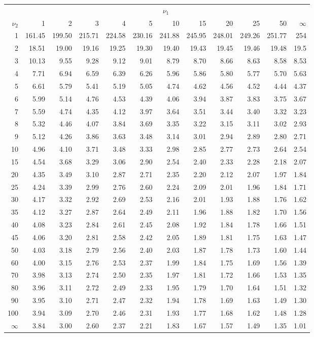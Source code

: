 \documentclass{article}
\begin{document}
\begin{tabular}{|r|rrrrrrrrrrr|}
	\hline
	& \multicolumn{11}{|c|}{$\nu_1$} \\ 
	$\nu_2$ & 1 & 2 & 3 & 4 & 5 & 10 & 15 & 20 & 25 & 50 & $\infty$\\ \hline
	1 & 161.45 & 199.50 & 215.71 & 224.58 & 230.16 & 241.88 & 245.95 & 248.01 & 249.26 & 251.77 & 254\\ 
	2 & 18.51 & 19.00 & 19.16 & 19.25 & 19.30 & 19.40 & 19.43 & 19.45 & 19.46 & 19.48 & 19.5\\ 
	3 & 10.13 & 9.55 & 9.28 & 9.12 & 9.01 & 8.79 & 8.70 & 8.66 & 8.63 & 8.58 & 8.53\\ 
	4 & 7.71 & 6.94 & 6.59 & 6.39 & 6.26 & 5.96 & 5.86 & 5.80 & 5.77 & 5.70 & 5.63\\ 
	5 & 6.61 & 5.79 & 5.41 & 5.19 & 5.05 & 4.74 & 4.62 & 4.56 & 4.52 & 4.44 & 4.37\\ 
	6 & 5.99 & 5.14 & 4.76 & 4.53 & 4.39 & 4.06 & 3.94 & 3.87 & 3.83 & 3.75 & 3.67\\ 
	7 & 5.59 & 4.74 & 4.35 & 4.12 & 3.97 & 3.64 & 3.51 & 3.44 & 3.40 & 3.32 & 3.23\\ 
	8 & 5.32 & 4.46 & 4.07 & 3.84 & 3.69 & 3.35 & 3.22 & 3.15 & 3.11 & 3.02 & 2.93\\ 
	9 & 5.12 & 4.26 & 3.86 & 3.63 & 3.48 & 3.14 & 3.01 & 2.94 & 2.89 & 2.80 & 2.71\\ 
	10 & 4.96 & 4.10 & 3.71 & 3.48 & 3.33 & 2.98 & 2.85 & 2.77 & 2.73 & 2.64 & 2.54\\ 
	15 & 4.54 & 3.68 & 3.29 & 3.06 & 2.90 & 2.54 & 2.40 & 2.33 & 2.28 & 2.18 & 2.07\\ 
	20 & 4.35 & 3.49 & 3.10 & 2.87 & 2.71 & 2.35 & 2.20 & 2.12 & 2.07 & 1.97 & 1.84\\ 
	25 & 4.24 & 3.39 & 2.99 & 2.76 & 2.60 & 2.24 & 2.09 & 2.01 & 1.96 & 1.84 & 1.71\\ 
	30 & 4.17 & 3.32 & 2.92 & 2.69 & 2.53 & 2.16 & 2.01 & 1.93 & 1.88 & 1.76 & 1.62\\ 
	35 & 4.12 & 3.27 & 2.87 & 2.64 & 2.49 & 2.11 & 1.96 & 1.88 & 1.82 & 1.70 & 1.56\\ 
	40 & 4.08 & 3.23 & 2.84 & 2.61 & 2.45 & 2.08 & 1.92 & 1.84 & 1.78 & 1.66 & 1.51\\ 
	45 & 4.06 & 3.20 & 2.81 & 2.58 & 2.42 & 2.05 & 1.89 & 1.81 & 1.75 & 1.63 & 1.47\\ 
	50 & 4.03 & 3.18 & 2.79 & 2.56 & 2.40 & 2.03 & 1.87 & 1.78 & 1.73 & 1.60 & 1.44\\ 
	60 & 4.00 & 3.15 & 2.76 & 2.53 & 2.37 & 1.99 & 1.84 & 1.75 & 1.69 & 1.56 & 1.39\\ 
	70 & 3.98 & 3.13 & 2.74 & 2.50 & 2.35 & 1.97 & 1.81 & 1.72 & 1.66 & 1.53 & 1.35\\ 
	80 & 3.96 & 3.11 & 2.72 & 2.49 & 2.33 & 1.95 & 1.79 & 1.70 & 1.64 & 1.51 & 1.32\\ 
	90 & 3.95 & 3.10 & 2.71 & 2.47 & 2.32 & 1.94 & 1.78 & 1.69 & 1.63 & 1.49 & 1.30\\ 
	100 & 3.94 & 3.09 & 2.70 & 2.46 & 2.31 & 1.93 & 1.77 & 1.68 & 1.62 & 1.48 & 1.28 \\ 
	$\infty$ & 3.84 & 3.00 & 2.60 & 2.37 & 2.21 & 1.83 & 1.67 & 1.57 & 1.49 & 1.35 & 1.01 \\ 
	\hline
\end{tabular}
\end{document}

